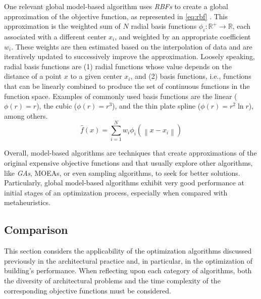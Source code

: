 	One relevant global model-based algorithm uses \textit{\acp{RBF}} to create a global approximation of the objective function, as represented in \cref{eq:rbf} \cite{Forrester2009SBO}. This approximation is the weighted sum of $N$ radial basis functions $\phi_i: \mathbb{R}^+ \to \mathbb{R}$, each associated with a different center $x_i$, and weighted by an appropriate coefficient $w_i$. These weights are then estimated based on the interpolation of data and are iteratively updated to successively improve the approximation. Loosely speaking, radial basis functions are (1) radial functions whose value depends on the distance of a point $x$ to a given center $x_i$, and (2) basis functions, i.e., functions that can be linearly combined to produce the set of continuous functions in the function space. Examples of commonly used basis functions are the linear ($\phi(r) = r$), the cubic ($\phi(r) = r^3$), and the thin plate spline ($\phi(r) = r^2 \ln r$), among others.
	\begin{equation}\label{eq:rbf}
		\hat{f}(x) = \sum_{i=1}^{N}w_i\phi_i(\left\lVert x-x_i \right\rVert)
	\end{equation}
	
	Overall, model-based algorithms are techniques that create approximations of the original expensive objective functions and that usually explore other algorithms, like \textit{\acp{GA}}, \acp{MOEA}, or even sampling algorithms, to seek for better solutions. Particularly, global model-based algorithms exhibit very good performance at initial stages of an optimization process, especially when compared with metaheuristics. %
	
	\subsection{Comparison}
	\label{ssec:comparisondfo}
	This section considers the applicability of the optimization algorithms discussed previously in the architectural practice and, in particular, in the optimization of building's performance. When reflecting upon each category of algorithms, both the diversity of architectural problems and the time complexity of the corresponding objective functions must be considered.
	
